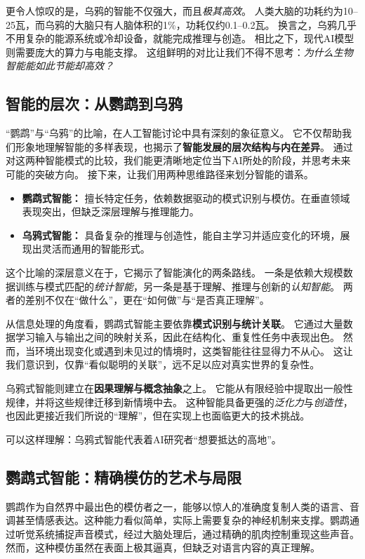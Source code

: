 更令人惊叹的是，乌鸦的智能不仅强大，而且\emph{极其高效}。
人类大脑的功耗约为10–25瓦，而乌鸦的大脑只有人脑体积的1\%，功耗仅约0.1–0.2瓦。
换言之，乌鸦几乎不用复杂的能源系统或冷却设备，就能完成推理与创造。
相比之下，现代AI模型则需要庞大的算力与电能支撑。
这组鲜明的对比让我们不得不思考：\emph{为什么生物智能能如此节能却高效？}

\subsection{智能的层次：从鹦鹉到乌鸦}
“鹦鹉”与“乌鸦”的比喻，在人工智能讨论中具有深刻的象征意义。
它不仅帮助我们形象地理解智能的多样表现，也揭示了\textbf{智能发展的层次结构与内在差异}。
通过对这两种智能模式的比较，我们能更清晰地定位当下AI所处的阶段，并思考未来可能的突破方向。
接下来，让我们用两种思维路径来划分智能的谱系。

\begin{itemize}
\item \textbf{鹦鹉式智能：} 擅长特定任务，依赖数据驱动的模式识别与模仿。在垂直领域表现突出，但缺乏深层理解与推理能力。
\item \textbf{乌鸦式智能：} 具备复杂的推理与创造性，能自主学习并适应变化的环境，展现出灵活而通用的智能形式。
\end{itemize}

这个比喻的深层意义在于，它揭示了智能演化的两条路线。
一条是依赖大规模数据训练与模式匹配的\emph{统计智能}，另一条是基于理解、推理与创新的\emph{认知智能}。
两者的差别不仅在“做什么”，更在“如何做”与“是否真正理解”。

从信息处理的角度看，鹦鹉式智能主要依靠\textbf{模式识别与统计关联}。
它通过大量数据学习输入与输出之间的映射关系，因此在结构化、重复性任务中表现出色。
然而，当环境出现变化或遇到未见过的情境时，这类智能往往显得力不从心。
这让我们意识到，仅靠“看似聪明的关联”，远不足以应对真实世界的复杂性。

乌鸦式智能则建立在\textbf{因果理解与概念抽象}之上。
它能从有限经验中提取出一般性规律，并将这些规律迁移到新情境中去。
这种智能具备更强的\emph{泛化力}与\emph{创造性}，也因此更接近我们所说的“理解”，但在实现上也面临更大的技术挑战。

可以这样理解：乌鸦式智能代表着AI研究者“想要抵达的高地”。

\subsection{鹦鹉式智能：精确模仿的艺术与局限}

鹦鹉作为自然界中最出色的模仿者之一，能够以惊人的准确度复制人类的语言、音调甚至情感表达。这种能力看似简单，实际上需要复杂的神经机制来支撑。鹦鹉通过听觉系统捕捉声音模式，经过大脑处理后，通过精确的肌肉控制重现这些声音。然而，这种模仿虽然在表面上极其逼真，但缺乏对语言内容的真正理解。

